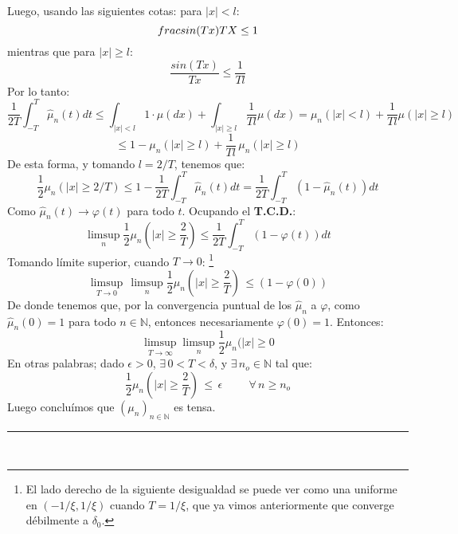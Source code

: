 \documentclass[a4paper]{article}
\numberwithin{equation}{subsection}
\numberwithin{definicion}{subsection}
\def\N{\mathbb N}
\def\to{\rightarrow}
\begin{document}
\begin{itemize}
    Luego, usando las siguientes cotas: para $|x|<l$:
    \[\\frac{sin(Tx)}{TX} \leq 1\]
    mientras que para  $|x|\geq l$:
    \[\frac{sin(Tx)}{Tx} \leq \frac{1}{Tl}\]
    Por lo tanto:
    \[\frac{1}{2T}\int_{-T}^{T}\hat{\mu}_n(t)dt \leq \int_{|x|<l}1\cdot \mu(dx) + \int_{|x|\geq l}\frac{1}{Tl}\mu(dx) = \mu_n(|x|<l) +\frac{1}{Tl}\mu(|x|\geq l)\]
    \[\leq 1 - \mu_n(|x|\geq l) +\frac{1}{Tl}\,\mu_n(|x|\geq l)\]
    De esta forma, y tomando $l = 2/T$, tenemos que:
    \[\frac{1}{2}\mu_n(|x|\geq 2/T) \leq 1 - \frac{1}{2T}\int_{-T}^{T}\hat{\mu}_n(t)dt = \frac{1}{2T}\int_{-T}^{T}\left(1-\hat{\mu}_n(t)\right)dt\]
    Como $\hat{\mu}_n(t) \rightarrow\varphi(t)$ para todo $t$. Ocupando el \textbf{T.C.D.}:
    \[\limsup_{n}\frac{1}{2}\mu_n(|x|\geq \frac{2}{T}) \leq \frac{1}{2T}\int_{-T}^{T}(1-\varphi(t)) dt\]
    Tomando límite superior, cuando $T\rightarrow 0$: \footnote{El lado derecho de la siguiente desigualdad se puede ver como una uniforme en $(-1/\xi,1/\xi)$ cuando $T=1/\xi$, que ya vimos anteriormente que converge débilmente  a $\delta_0$.}
    \[\limsup_{T\to 0}\,\limsup_{n}\frac{1}{2}\mu_n(|x|\geq\frac{2}{T})\,\leq (1-\varphi(0))\]
    De donde tenemos que, por la convergencia puntual de los $\hat{\mu}_n$ a $\varphi$, como $\hat{\mu}_n(0)=1$ para todo $n\in\N$, entonces necesariamente $\varphi(0)=1$. Entonces:
    \[\limsup_{T\to \infty}\limsup_{n}\frac{1}{2}\mu_n(|x|\geq 0\]
    En otras palabras; dado $\epsilon >0$, $\exists\,0<T<\delta$, y $\exists\,n_o \in \N$ tal que:
    \[\frac{1}{2}\mu_n(|x|\geq \frac{2}{T})\,\leq\,\epsilon\hspace{1cm}\forall\,n\geq n_o\]
    Luego concluímos que $(\mu_n)_{n\in\N}$ es tensa. \rule{0.7em}{0.7em}\\ \newline
\end{itemize}
\end{document}
